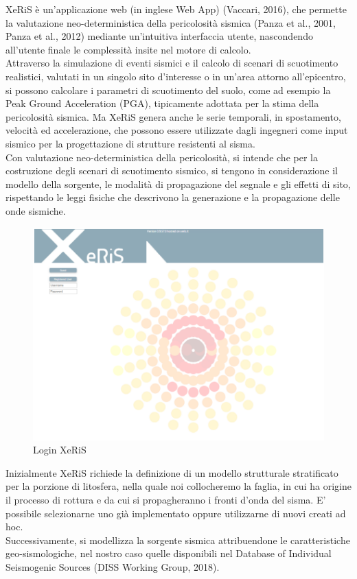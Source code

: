 \documentclass[a4paper,12pt,titlepage]{article}
\begin{document}
XeRiS è un'applicazione web (in inglese Web App) (Vaccari, 2016), che permette la valutazione neo-deterministica della pericolosità sismica (Panza et al., 2001, Panza et al., 2012) mediante un'intuitiva interfaccia utente, nascondendo all'utente finale le complessità insite nel motore di calcolo.\\
Attraverso la simulazione di eventi sismici e il calcolo di scenari di scuotimento realistici, valutati in un singolo sito d'interesse o in un'area attorno all'epicentro, si possono calcolare i parametri di scuotimento del suolo, come ad esempio la Peak Ground Acceleration (PGA), tipicamente adottata per la stima della pericolosità sismica. Ma XeRiS genera anche le serie temporali, in spostamento, velocità ed accelerazione, che possono essere utilizzate dagli ingegneri come input sismico per la progettazione di strutture resistenti al sisma.\\
Con valutazione neo-deterministica della pericolosità, si intende che per la costruzione degli scenari di scuotimento sismico, si tengono in considerazione il modello della sorgente, le modalità di propagazione del segnale e gli effetti di sito, rispettando le leggi fisiche che descrivono la generazione e la propagazione delle onde sismiche.
\begin{figure}[htbp]
 \centering
 \includegraphics[width=.5\linewidth]{Img/XerisLogIn.png}
 \caption{Login XeRiS}
 \label{fig:Login XeRiS2}
\end{figure}
Inizialmente XeRiS richiede la definizione di un modello strutturale stratificato per la porzione di litosfera, nella quale noi collocheremo la faglia, in cui ha origine il processo di rottura e da cui si propagheranno i fronti d'onda del sisma. E' possibile selezionarne uno già implementato oppure utilizzarne di nuovi creati ad hoc.\\
Successivamente, si modellizza la sorgente sismica attribuendone le caratteristiche geo-sismologiche, nel nostro caso quelle disponibili nel Database of Individual Seismogenic Sources (DISS Working Group, 2018).\\
\end{document}
